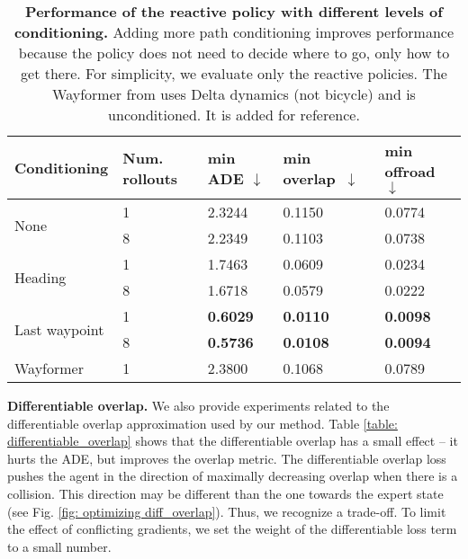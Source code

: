 \begin{table}[h]
    \small
    \centering
    \begin{tabular}[width=\textwidth]{ p{} | p{} | p{} p{} p{} } \toprule[1.5pt]
         \textbf{Conditioning} & Num. rollouts & min ADE $\downarrow$ & min \mbox{overlap $\downarrow$} &  min offroad $\downarrow$  \\
         \midrule[1pt]
         \multirow{2}{*}{None} & 1 & 2.3244 &  0.1150 & 0.0774 \\
         & 8 & 2.2349 &  0.1103 & 0.0738 \\
         \multirow{2}{*}{Heading} & 1 & 1.7463 &  0.0609 & 0.0234 \\
         & 8 & 1.6718 &  0.0579 & 0.0222 \\
         \multirow{2}{*}{Last waypoint} & 1 &  \textbf{0.6029} &  \textbf{0.0110} & \textbf{0.0098} \\
         & 8 &  \textbf{0.5736} &  \textbf{0.0108} & \textbf{0.0094} \\    \hline
         Wayformer & 1 & 2.3800 & 0.1068 & 0.0789 \\
         \bottomrule[1.5pt]
    \end{tabular}
    \captionsetup{aboveskip=0.3cm, belowskip=-0.3cm}
    \caption{\textbf{Performance of the reactive policy with different levels of conditioning.} Adding more path conditioning improves performance because the policy does not need to decide where to go, only how to get there. For simplicity, we evaluate only the reactive policies. The Wayformer \cite{nayakanti2023wayformer} from \cite{gulino2024waymax} uses Delta dynamics (not bicycle) and is unconditioned. It is added for reference.}
    \label{table: different_levels_of_conditioning}
\end{table}

\textbf{Differentiable overlap.} We also provide experiments related to the differentiable overlap approximation used by our method. Table \ref{table: differentiable_overlap} shows that the differentiable overlap has a small effect -- it hurts the ADE, but improves the overlap metric. The differentiable overlap loss pushes the agent in the direction of maximally decreasing overlap when there is a collision. This direction may be different than the one towards the expert state (see Fig. \ref{fig: optimizing diff_overlap}). Thus, we recognize a trade-off. To limit the effect of conflicting gradients, we set the weight of the differentiable loss term to a small number.

